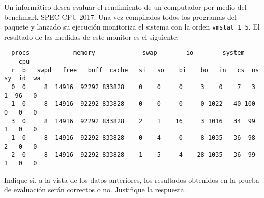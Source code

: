 \begin{ejercicio}
    Un informático desea evaluar el rendimiento de un computador por medio del benchmark SPEC CPU 2017. Una vez compilados todos los programas del paquete y lanzado su ejecución monitoriza el sistema con la orden \verb|vmstat 1 5|. El resultado de las medidas de este monitor es el siguiente:
    \begin{verbatim}
  procs  ----------memory---------  --swap--  ----io---- ---system---  ----cpu----
  r  b   swpd   free   buff  cache   si   so    bi    bo   in   cs  us  sy  id  wa
  0  0     8  14916  92292 833828    0    0     0     3    0    7   3   1  96   0
  1  0     8  14916  92292 833828    0    0     0     0 1022   40 100   0   0   0
  3  0     8  14916  92292 833828    2    1    16     3 1016   34  99   1   0   0
  1  0     8  14916  92292 833828    0    4     0     8 1035   36  98   2   0   0
  2  0     8  14916  92292 833828    1    5     4    28 1035   36  99   1   0   0
    \end{verbatim}

    Indique si, a la vista de los datos anteriores, los resultados obtenidos en la prueba de evaluación serán correctos o no. Justifique la respuesta.
\end{ejercicio}
\begin{comment}
    Solución: El sistema operativo presenta actividad de intercambio con el disco y ninguno de los programas del benchmark debería provocarlos.
\end{comment}

